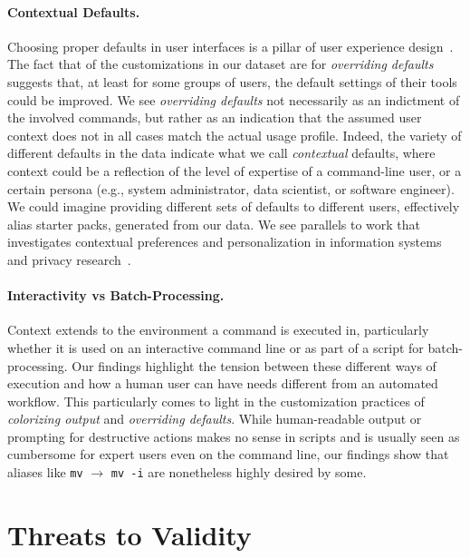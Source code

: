\documentclass[smallextended,natbib]{svjour3}
\newcommand{\per}[1]{\numprint[\%]{#1}}
\newcommand{\alias}[2]{{\texttt{#1} $\rightarrow$ \texttt{#2}}}
\begin{document}
\paragraph{Contextual Defaults.}

Choosing proper defaults in user interfaces is a pillar of user experience design~\citep{nielsen2005power}.
The fact that \per{14.48} of the customizations in our dataset are for \emph{overriding defaults} suggests that, at least for some groups of users, the default settings of their tools could be improved.
We see \emph{overriding defaults} not necessarily as an indictment of the involved commands, but rather as an indication that the assumed user context does not in all cases match the actual usage profile.
Indeed, the variety of different defaults in the data indicate what we call \emph{contextual} defaults, where context could be a reflection of the level of expertise of a command-line user, or a certain persona (e.g., system administrator, data scientist, or software engineer).
We could imagine providing different sets of defaults to different users, effectively alias starter packs, generated from our data.
We see parallels to work that investigates contextual preferences and personalization in information systems~\citep{de:15, stefanidis:11} and privacy research~\citep{wijesekera:18, alom:19}. 

\paragraph{Interactivity vs Batch-Processing.}

Context extends to the environment a command is executed in, particularly whether it is used on an interactive command line or as part of a script for batch-processing.
Our findings highlight the tension between these different ways of execution and how a human user can have needs different from an automated workflow.
This particularly comes to light in the customization practices of \emph{colorizing output} and \emph{overriding defaults}.
While human-readable output or prompting for destructive actions makes no sense in scripts and is usually seen as cumbersome for expert users even on the command line, our findings show that aliases like \alias{mv}{mv -i} are nonetheless highly desired by some.

\section{Threats to Validity}
\end{document}
